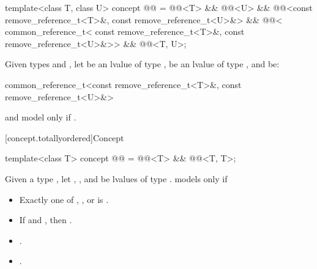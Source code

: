 \begin{itemdecl}
template<class T, class U>
  concept @@ =
    @@<T> && @@<U> &&
    @@<const remove_reference_t<T>&, const remove_reference_t<U>&> &&
    @@<
      common_reference_t<
        const remove_reference_t<T>&,
        const remove_reference_t<U>&>> &&
    @@<T, U>;
\end{itemdecl}

\begin{itemdescr}
\pnum
Given types  and ,
let  be an lvalue of type ,
 be an lvalue of type ,
and  be:
\begin{codeblock}
common_reference_t<const remove_reference_t<T>&, const remove_reference_t<U>&>
\end{codeblock}
 and  model
 only if
.
\end{itemdescr}

[concept.totallyordered]{Concept }

\begin{itemdecl}
template<class T>
  concept @@ =
    @@<T> && @@<T, T>;
\end{itemdecl}

\begin{itemdescr}
\pnum
Given a type , let , , and  be
lvalues of type .
 models  only if
\begin{itemize}
\item Exactly one of , , or
       is .
\item If  and , then
      .
\item {}.
\item {}.
\end{itemize}
\end{itemdescr}

